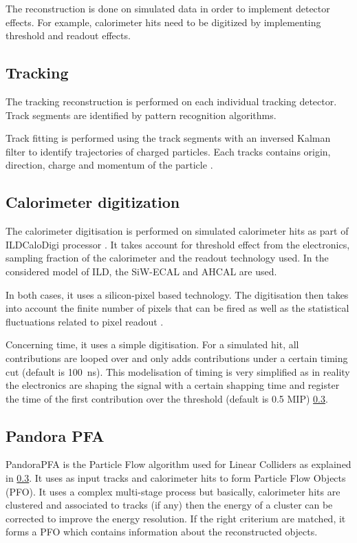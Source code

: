 The reconstruction is done on simulated data in order to implement detector effects. For example, calorimeter hits need to be digitized by implementing threshold and readout effects.

\subsection{Tracking}

The tracking reconstruction is performed on each individual tracking detector. Track segments are identified by pattern recognition algorithms.

Track fitting is performed using the track segments with an inversed Kalman filter to identify trajectories of charged particles. Each tracks contains origin, direction, charge and momentum of the particle \cite{Fruhwirth:1987fm}.

\subsection{Calorimeter digitization}

The calorimeter digitisation is performed on simulated calorimeter hits as part of ILDCaloDigi processor \cite{Jeans2015}. It takes account for threshold effect from the electronics, sampling fraction of the calorimeter and the readout technology used. In the considered model of ILD, the SiW-ECAL and AHCAL are used.

In both cases, it uses a silicon-pixel based technology. The digitisation then takes into account the finite number of pixels that can be fired as well as the statistical fluctuations related to pixel readout \cite{Hartbrich:2016bbz}.

Concerning time, it uses a simple digitisation. For a simulated hit, all contributions are looped over and only adds contributions under a certain timing cut (default is \SI{100}{\ns}). This modelisation of timing is very simplified as in reality the electronics are shaping the signal with a certain shapping time and register the time of the first contribution over the threshold (default is 0.5 MIP) \ref{}.

\subsection{Pandora PFA}

PandoraPFA \cite{Thomson:2009rp} is the Particle Flow algorithm used for Linear Colliders as explained in \ref{}. It uses as input tracks and calorimeter hits to form Particle Flow Objects (PFO). It uses a complex multi-stage process but basically, calorimeter hits are clustered and associated to tracks (if any) then the energy of a cluster can be corrected to improve the energy resolution. If the right criterium are matched, it forms a PFO which contains information about the reconstructed objects.

